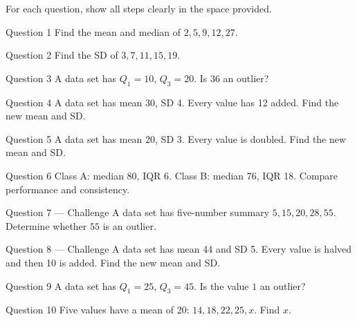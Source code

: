 \documentclass[11pt]{article}
\begin{document}
\clearpage
{}
For each question, show all steps clearly in the space provided.

\begin{qbox}{Question 1}
Find the mean and median of $2,5,9,12,27$.\workspace{2.4cm}
\end{qbox}

\begin{qbox}{Question 2}
Find the SD of $3,7,11,15,19$.\workspace{2.4cm}
\end{qbox}

\begin{qbox}{Question 3}
A data set has $Q_1=10$, $Q_3=20$. Is $36$ an outlier?\workspace{2.4cm}
\end{qbox}

\begin{qbox}{Question 4}
A data set has mean 30, SD 4. Every value has 12 added. Find the new mean and SD.\workspace{2.4cm}
\end{qbox}

\begin{qbox}{Question 5}
A data set has mean 20, SD 3. Every value is doubled. Find the new mean and SD.\workspace{2.4cm}
\end{qbox}

\begin{qbox}{Question 6}
Class A: median 80, IQR 6. Class B: median 76, IQR 18. Compare performance and consistency.\workspace{2.4cm}
\end{qbox}

\begin{qbox}{Question 7 --- Challenge}
A data set has five-number summary $5,15,20,28,55$. Determine whether $55$ is an outlier.\workspace{3.2cm}
\end{qbox}

\begin{qbox}{Question 8 --- Challenge}
A data set has mean 44 and SD 5. Every value is halved and then 10 is added. Find the new mean and SD.\workspace{3.2cm}
\end{qbox}

\begin{qbox}{Question 9}
A data set has $Q_1=25$, $Q_3=45$. Is the value $1$ an outlier?\workspace{2.4cm}
\end{qbox}

\begin{qbox}{Question 10}
Five values have a mean of 20: $14,18,22,25,x$. Find $x$.\workspace{2.4cm}
\end{qbox}
\end{document}
